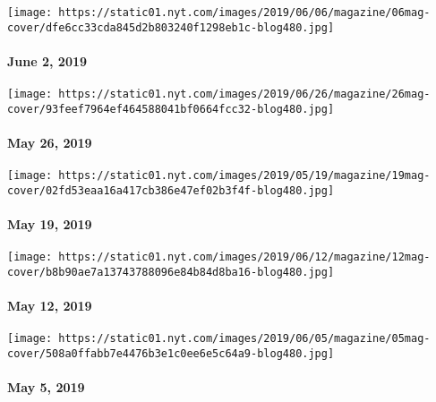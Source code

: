 \href{https://www.nytimes.com/issue/magazine/2019/06/06/the-60219-issue}{}

\texttt{[image: https://static01.nyt.com/images/2019/06/06/magazine/06mag-cover/dfe6cc33cda845d2b803240f1298eb1c-blog480.jpg]}

\hypertarget{june-2-2019}{%
\paragraph{June 2, 2019}\label{june-2-2019}}

\href{https://www.nytimes.com/issue/magazine/2019/06/06/the-52619-issue}{}

\texttt{[image: https://static01.nyt.com/images/2019/06/26/magazine/26mag-cover/93feef7964ef464588041bf0664fcc32-blog480.jpg]}

\hypertarget{may-26-2019}{%
\paragraph{May 26, 2019}\label{may-26-2019}}

\href{https://www.nytimes.com/issue/magazine/2019/05/17/the-51919-issue}{}

\texttt{[image: https://static01.nyt.com/images/2019/05/19/magazine/19mag-cover/02fd53eaa16a417cb386e47ef02b3f4f-blog480.jpg]}

\hypertarget{may-19-2019}{%
\paragraph{May 19, 2019}\label{may-19-2019}}

\href{https://www.nytimes.com/issue/magazine/2019/05/17/the-51219-issue}{}

\texttt{[image: https://static01.nyt.com/images/2019/06/12/magazine/12mag-cover/b8b90ae7a13743788096e84b84d8ba16-blog480.jpg]}

\hypertarget{may-12-2019}{%
\paragraph{May 12, 2019}\label{may-12-2019}}

\href{https://www.nytimes.com/issue/magazine/2019/05/17/the-5519-issue}{}

\texttt{[image: https://static01.nyt.com/images/2019/06/05/magazine/05mag-cover/508a0ffabb7e4476b3e1c0ee6e5c64a9-blog480.jpg]}

\hypertarget{may-5-2019}{%
\paragraph{May 5, 2019}\label{may-5-2019}}

